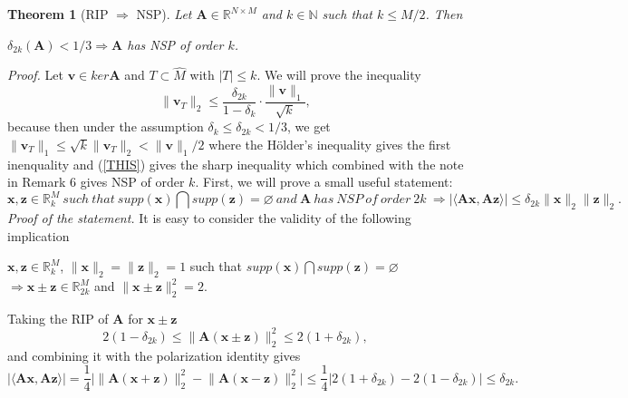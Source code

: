 \documentclass[11pt,american]{book} %
\theoremstyle{plain}
\newtheorem{thm}{Theorem}
\theoremstyle{definition}
\begin{document}
\begin{thm}[RIP $\Rightarrow$ NSP]
	Let $\bm{A} \in \mathbb{R}^{N \times M}$ and $k \in \mathbb{N}$ such that $k \leqslant M/2$. Then
	\begin{center}
		$\delta_{2k}(\bm{A}) < 1/3 \Rightarrow \bm{A}$ has NSP of order $k$.
	\end{center}
	
\end{thm}
\emph{Proof.} Let $\bm{v} \in ker \bm{A}$ and $T \subset \hat{M}$ with $|T| \leqslant k$. We will prove the inequality
\begin{equation}
	\lVert \bm{v}_T\rVert_{2} \leqslant \frac{\delta_{2k}}{1-\delta_{k}} \cdot \frac{\lVert \bm{v} \rVert_{1}}{\sqrt{k}}, \label{THIS}
\end{equation}
because then under the assumption $\delta_{k} \leqslant \delta_{2k} < 1/3$, we get $\lVert \bm{v}_T \rVert_1 \leqslant \sqrt k\lVert \bm{v}_T \rVert_2 < \lVert \bm{v} \rVert_1 /2$ where the Hölder's inequality gives the first inenquality and (\ref{THIS}) gives the sharp inequality which combined with the note in Remark 6 gives NSP of order $k$. First, we will prove a small useful statement:
\begin{equation}
	\bm{x},\bm{z} \in \mathbb{R}^{M}_k \ such \ that \ supp(\bm{x}) \bigcap supp(\bm{z}) = \varnothing \ and \ \bm{A} \ has \ NSP \ of \ order \ 2k \ \Rightarrow |\langle\bm{Ax},\bm{Az}\rangle| \leqslant \delta_{2k} \lVert \bm{x} \rVert_2 \lVert \bm{z} \rVert_2. \label{statement}
\end{equation}
\emph{Proof of the statement.} It is easy to consider the validity of the following implication
\begin{center}
	$\bm{x},\bm{z} \in \mathbb{R}^{M}_k$, $\lVert \bm{x} \rVert_2 = \lVert \bm{z} \rVert_2 = 1$ such that $supp(\bm{x}) \bigcap supp(\bm{z}) = \varnothing$ $\Rightarrow \bm{x} \pm \bm{z} \in \mathbb{R}^{M}_{2k}$ and $\lVert \bm{x} \pm \bm{z} \rVert_2^2 = 2$.
\end{center}
Taking the RIP of $\bm{A}$ for $\bm{x} \pm \bm{z}$
\begin{equation*}
	2(1-\delta_{2k})\leqslant \lVert\bm{A}( \bm{\bm{x} \pm \bm{z}})\rVert_{2}^2 \leqslant 2(1+\delta_{2k}),
\end{equation*}
and combining it with the polarization identity gives
\begin{equation*}
	|\langle\bm{Ax},\bm{Az}\rangle| = \frac{1}{4} \Big|\lVert \bm{A}(\bm{x}+\bm{z})\rVert_2^{2} - \lVert \bm{A}(\bm{x}-\bm{z})\rVert_2^{2}\Big|\leqslant \frac{1}{4} \Big| 2(1+\delta_{2k}) - 2(1-\delta_{2k})\Big| \leqslant \delta_{2k}.
\end{equation*}
\end{document}

